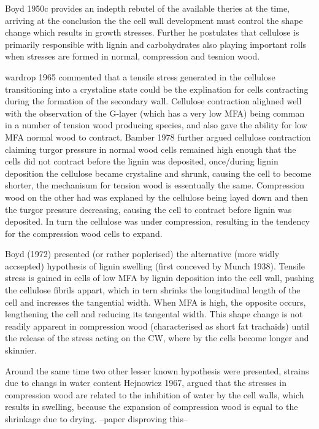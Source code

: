\documentclass{article}
\begin{document}
Boyd 1950c provides an indepth rebutel of the available theries at the time,
arriving at the conclusion the the cell wall development must control the shape
change which results in growth stresses. Further he postulates that cellulose
is primarily responsible with lignin and carbohydrates also playing important
rolls when stresses are formed in normal, compression and tesnion wood.

wardrop 1965 commented that a tensile stress generated in the cellulose
transitioning into a crystaline state could be the explination for cells
contracting during the formation of the secondary wall. Cellulose contraction
alighned well with the observation of the G-layer (which has  a very low
MFA) being comman in a number of tension wood producing species, and also gave
the ability for low MFA normal wood to contract. Bamber 1978 further argued
cellulose contraction claiming turgor pressure in normal wood cells remained
high enough that the cells did not contract before the lignin was deposited,
once/during lignin deposition the cellulose became crystaline and shrunk,
causing the cell to become shorter, the mechanisum for tension wood is
essentually the same. Compression wood on the other had was explaned by the
cellulose being layed down and then the turgor pressure decreasing, causing the
cell to contract before lignin was deposited. In turn the cellulose was under
compression, resulting in the tendency for the compression wood cells to
expand.

Boyd (1972) presented (or rather poplerised) the alternative (more widly
accsepted) hypothesis of lignin swelling (first conceved by Munch 1938). Tensile
stress is gained in cells of low MFA by lignin deposition into the cell wall,
pushing the cellulose fibrils appart, which in tern shrinks the longitudinal
length of the cell and incresses the tangential width. When MFA is high, the
opposite occurs, lengthening the cell and reducing its tangental width. This
shape change is not readily apparent in compression wood (characterised as short fat
trachaids) until the release of the stress acting on the CW, where by the cells
become longer and skinnier.

Around the same time two other lesser known hypothesis were presented,  strains
due to changs in water content Hejnowicz 1967, argued that the stresses in
compression wood are related to the inhibition of water by the cell walls,
which results in swelling, because the expansion of compression wood is equal to
the shrinkage due to drying. --paper disproving this--
\end{document}
